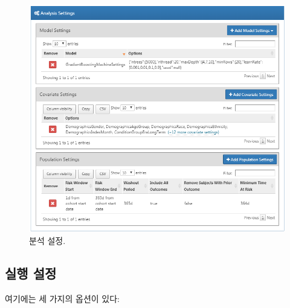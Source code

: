 \documentclass[10.5pt]{book}
\theoremstyle{definition}
\theoremstyle{definition}
\theoremstyle{definition}
\theoremstyle{remark}
\begin{document}
\begin{figure}

{\centering \includegraphics[width=1\linewidth]{images/PatientLevelPrediction/analysisSettings} 

}

\caption{분석 설정.}\label{fig:analysisSettings}
\end{figure}

\subsection{실행 설정}\label{-}

여기에는 세 가지의 옵션이 있다:
\end{document}
